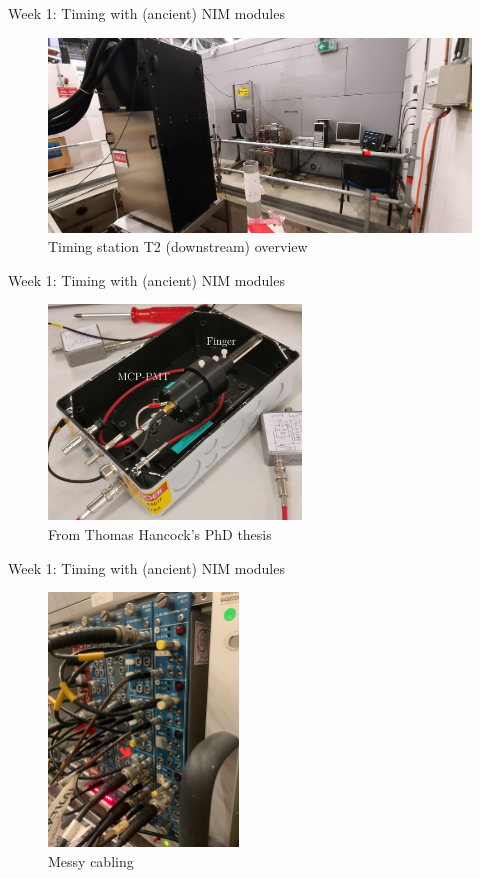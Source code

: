 \documentclass{beamer}
\begin{document}
\begin{frame}{Week 1: Timing with (ancient) NIM modules}
  \begin{figure}
    \centering
    \includegraphics[width = 1.0\textwidth]{Plots/T2_overview.jpg}
    \caption{Timing station T2 (downstream) overview}
  \end{figure}
\end{frame}

\begin{frame}{Week 1: Timing with (ancient) NIM modules}
  \begin{figure}
    \centering
    \includegraphics[width = 0.6\textwidth]{Plots/BorosilicateFinger.png}
    \caption{From Thomas Hancock's PhD thesis}
  \end{figure}
\end{frame}

\begin{frame}{Week 1: Timing with (ancient) NIM modules}
  \begin{figure}
    \centering
    \includegraphics[width = 0.45\textwidth]{Plots/Cabling.jpg}
    \caption{Messy cabling}
  \end{figure}
\end{frame}
\end{document}
